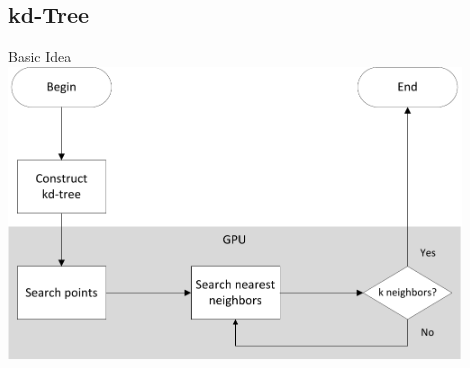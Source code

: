 \documentclass{beamer}
\begin{document}
\subsection*{kd-Tree}

\begin{frame}{Basic Idea}
	\centering
	\includegraphics[width=0.9\textwidth]{kdtree_procedure.pdf}
\end{frame}
\end{document}
